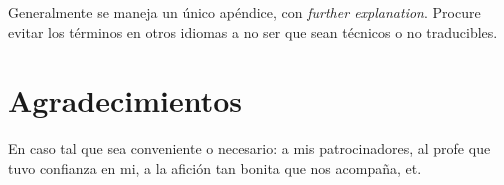\documentclass[journal]{IEEEtran}
\begin{document}
Generalmente se maneja un único apéndice, con \emph{further explanation}. Procure evitar los términos en otros idiomas a no ser que sean técnicos o no traducibles.





\section*{Agradecimientos}
En caso tal que sea conveniente o necesario: a mis patrocinadores, al profe que tuvo confianza en mi, a la afición tan bonita que nos acompaña, et.
\ifCLASSOPTIONcaptionsoff
  \newpage
\fi




\end{document}
